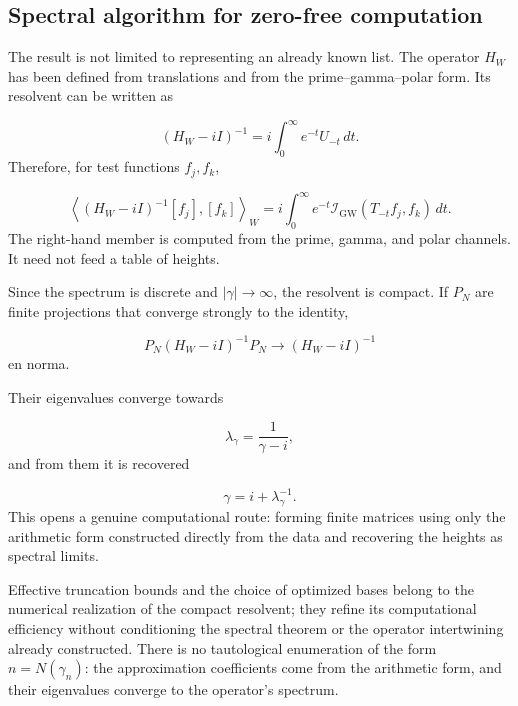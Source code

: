 \subsection{Spectral algorithm for zero-free computation}
The result is not limited to representing an already known list. The operator \(H_W\) has been defined from translations and from the prime–gamma–polar form. Its resolvent can be written as\par
\[
(H_W-iI)^{-1}
=
i\int_0^\infty
e^{-t}U_{-t}\,dt.
\]
Therefore, for test functions \(f_j,f_k\),\par
\[
\left\langle
(H_W-iI)^{-1}[f_j],[f_k]
\right\rangle_W
=
i\int_0^\infty
e^{-t}
\mathscr I_{\mathrm{GW}}(T_{-t}f_j,f_k)\,dt.
\]
The right-hand member is computed from the prime, gamma, and polar channels. It need not feed a table of heights.\par
Since the spectrum is discrete and \(|\gamma|\to\infty\), the resolvent is compact. If \(P_N\) are finite projections that converge strongly to the identity,\par
\[
P_N(H_W-iI)^{-1}P_N
\longrightarrow
(H_W-iI)^{-1}
\]
en norma.\par
Their eigenvalues converge towards\par
\[
\lambda_\gamma
=
\frac1{\gamma-i},
\]
and from them it is recovered\par
\[
\gamma=i+\lambda_\gamma^{-1}.
\]
This opens a genuine computational route: forming finite matrices using only the arithmetic form constructed directly from the data and recovering the heights as spectral limits.\par
Effective truncation bounds and the choice of optimized bases belong to the numerical realization of the compact resolvent; they refine its computational efficiency without conditioning the spectral theorem or the operator intertwining already constructed. There is no tautological enumeration of the form \(n=N(\gamma_n)\): the approximation coefficients come from the arithmetic form, and their eigenvalues converge to the operator's spectrum.\par
{}
